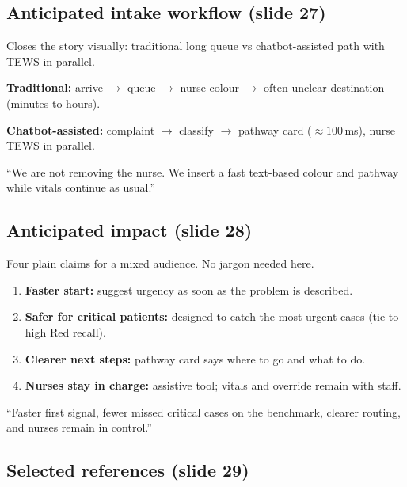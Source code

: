 \subsection{Anticipated intake workflow (slide 27)}

\begin{whybox}
Closes the story visually: traditional long queue vs chatbot-assisted path with TEWS in parallel.
\end{whybox}

\textbf{Traditional:} arrive \(\to\) queue \(\to\) nurse colour \(\to\) often unclear destination (minutes to hours).

\textbf{Chatbot-assisted:} complaint \(\to\) classify \(\to\) pathway card (\(\approx 100\)\,ms), nurse TEWS in parallel.

\begin{saybox}
``We are not removing the nurse. We insert a fast text-based colour and pathway while vitals continue as usual.''
\end{saybox}

\subsection{Anticipated impact (slide 28)}

\begin{whybox}
Four plain claims for a mixed audience. No jargon needed here.
\end{whybox}

\begin{enumerate}
  \item \textbf{Faster start:} suggest urgency as soon as the problem is described.
  \item \textbf{Safer for critical patients:} designed to catch the most urgent cases (tie to high Red recall).
  \item \textbf{Clearer next steps:} pathway card says where to go and what to do.
  \item \textbf{Nurses stay in charge:} assistive tool; vitals and override remain with staff.
\end{enumerate}

\begin{saybox}
``Faster first signal, fewer missed critical cases on the benchmark, clearer routing, and nurses remain in control.''
\end{saybox}

\subsection{Selected references (slide 29)}

